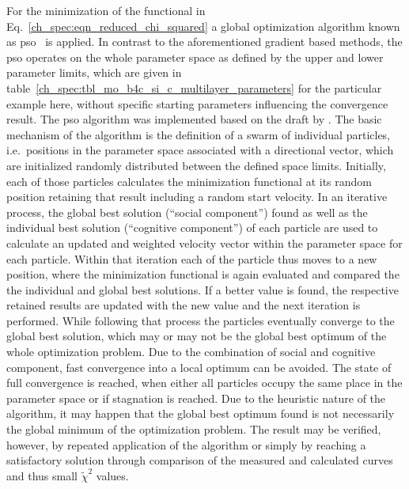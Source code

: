 For the minimization of the functional in Eq.~\eqref{ch_spec:eqn_reduced_chi_squared} a global optimization algorithm known as \gls{pso}~\cite{kennedy_particle_2011} is applied. In contrast to the aforementioned gradient based methods, the \gls{pso} operates on the whole parameter space as defined by the upper and lower parameter limits, which are given in table~\ref{ch_spec:tbl_mo_b4c_si_c_multilayer_parameters} for the particular example here, without specific starting parameters influencing the convergence result. The \gls{pso} algorithm was implemented based on the draft by \textcite{carlisle_off--shelf_2001}. The basic mechanism of the algorithm is the definition of a swarm of individual particles, i.e.~positions in the parameter space associated with a directional vector, which are initialized randomly distributed between the defined space limits. Initially, each of those particles calculates the minimization functional at its random position retaining that result including a random start velocity. In an iterative process, the global best solution (``social component'') found as well as the individual best solution (``cognitive component'') of each particle are used to calculate an updated and weighted velocity vector within the parameter space for each particle. Within that iteration each of the particle thus moves to a new position, where the minimization functional is again evaluated and compared the the individual and global best solutions. If a better value is found, the respective retained results are updated with the new value and the next iteration is performed. While following that process the particles eventually converge to the global best solution, which may or may not be the global best optimum of the whole optimization problem. Due to the combination of social and cognitive component, fast convergence into a local optimum can be avoided. The state of full convergence is reached, when either all particles occupy the same place in the parameter space or if stagnation is reached. Due to the heuristic nature of the algorithm, it may happen that the global best optimum found is not necessarily the global minimum of the optimization problem. The result may be verified, however, by repeated application of the algorithm or simply by reaching a satisfactory solution through comparison of the measured and calculated curves and thus small $\tilde{\chi}^2$ values.

